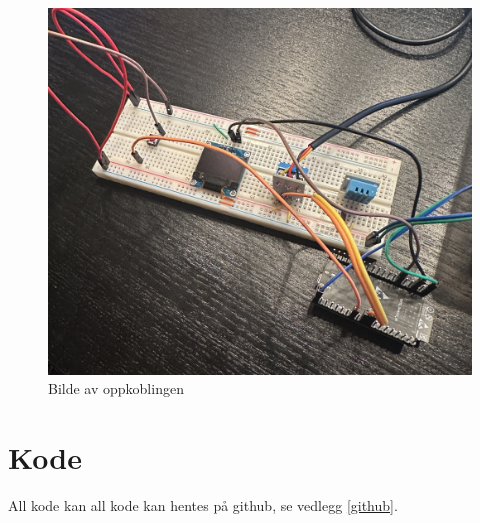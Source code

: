 \documentclass{article}
\begin{document}
\begin{figure}[h!]
    \centering
    \includegraphics[width=0.8\linewidth]{Oppkobling.JPEG}
    \caption{Bilde av oppkoblingen}
    \label{fig:oppkobling}
\end{figure}
\newpage
\section{Kode}
\label{Kode}
All kode kan all kode kan hentes på github, se vedlegg \ref{github}.
\end{document}
